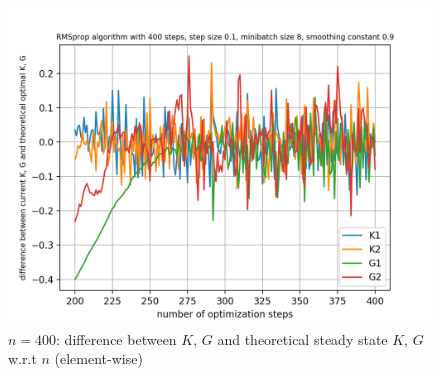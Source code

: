 \documentclass{article}
\begin{document}
\begin{figure}[h!]
\begin{minipage}[t]{.28\paperwidth}
		\includegraphics[width=1.0\textwidth]{Figures/d_last_200_n400_sep.png}
		\caption{$n = 400$: difference between $K$, $G$ and theoretical steady state $K$, $G$ w.r.t $n$ (element-wise)}
	\end{minipage}
\end{figure}
\end{document}
